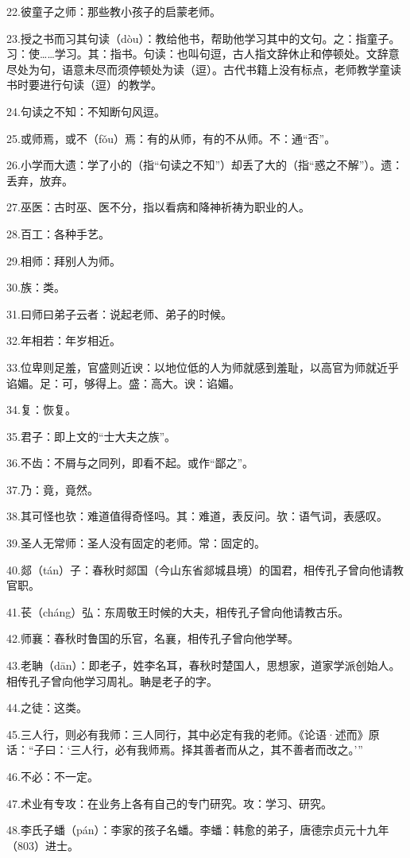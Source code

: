 \documentclass[letterpaper,10pt,english]{sphinxmanual}
\begin{document}
22.彼童子之师：那些教小孩子的启蒙老师。

23.授之书而习其句读（dòu）：教给他书，帮助他学习其中的文句。之：指童子。习：使……学习。其：指书。句读：也叫句逗，古人指文辞休止和停顿处。文辞意尽处为句，语意未尽而须停顿处为读（逗）。古代书籍上没有标点，老师教学童读书时要进行句读（逗）的教学。

24.句读之不知：不知断句风逗。

25.或师焉，或不（fǒu）焉：有的从师，有的不从师。不：通“否”。

26.小学而大遗：学了小的（指“句读之不知”）却丢了大的（指“惑之不解”）。遗：丢弃，放弃。

27.巫医：古时巫、医不分，指以看病和降神祈祷为职业的人。

28.百工：各种手艺。

29.相师：拜别人为师。

30.族：类。

31.曰师曰弟子云者：说起老师、弟子的时候。

32.年相若：年岁相近。

33.位卑则足羞，官盛则近谀：以地位低的人为师就感到羞耻，以高官为师就近乎谄媚。足：可，够得上。盛：高大。谀：谄媚。

34.复：恢复。

35.君子：即上文的“士大夫之族”。

36.不齿：不屑与之同列，即看不起。或作“鄙之”。

37.乃：竟，竟然。

38.其可怪也欤：难道值得奇怪吗。其：难道，表反问。欤：语气词，表感叹。

39.圣人无常师：圣人没有固定的老师。常：固定的。

40.郯（tán）子：春秋时郯国（今山东省郯城县境）的国君，相传孔子曾向他请教官职。

41.苌（cháng）弘：东周敬王时候的大夫，相传孔子曾向他请教古乐。

42.师襄：春秋时鲁国的乐官，名襄，相传孔子曾向他学琴。

43.老聃（dān）：即老子，姓李名耳，春秋时楚国人，思想家，道家学派创始人。相传孔子曾向他学习周礼。聃是老子的字。

44.之徒：这类。

45.三人行，则必有我师：三人同行，其中必定有我的老师。《论语·述而》原话：“子曰：‘三人行，必有我师焉。择其善者而从之，其不善者而改之。’”

46.不必：不一定。

47.术业有专攻：在业务上各有自己的专门研究。攻：学习、研究。

48.李氏子蟠（pán）：李家的孩子名蟠。李蟠：韩愈的弟子，唐德宗贞元十九年（803）进士。
\end{document}

